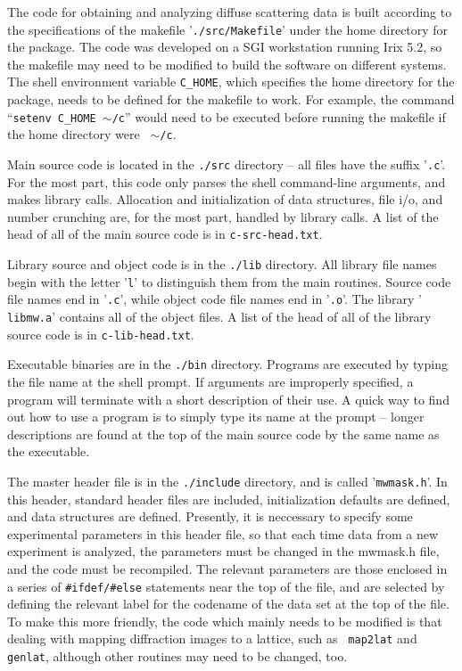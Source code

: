 
The code for obtaining and analyzing diffuse scattering data is built
according to the specifications of the makefile '{\tt ./src/Makefile}'
under the home directory for the package.  The code was developed on a
SGI workstation running Irix 5.2, so the makefile may need to be
modified to build the software on different systems.  The shell
environment variable {\tt C\_HOME}, which specifies the home directory
for the package, needs to be defined for the makefile to work.  For
example, the command ``{\tt setenv C\_HOME $\sim$/c}'' would need to be
executed before 
running the makefile if the home directory were {\tt
$\sim$/c}.

Main source code is located in the {\tt ./src} directory -- all files have
the suffix '{\tt .c}'.  For the most part, this code only parses the shell
command-line arguments, and makes library calls.  Allocation and
initialization of data structures, file i/o, and number crunching are,
for the most part,  handled by library calls.  A list of the head of
all of the main source code is in {\tt c-src-head.txt}.

Library source and object code is in the {\tt ./lib} directory.  All
library file names begin with the letter '{\tt l}' to distinguish them
from the main routines.  Source code file names end in '{\tt .c}',
while object code file names end in '{\tt .o}'.  The library '{\tt
libmw.a}' contains all of the object files.  A list of the head of all
of the library source code is in {\tt c-lib-head.txt}.

Executable binaries are in the {\tt ./bin} directory.  Programs are executed
by typing the file name at the shell prompt.  If arguments are
improperly specified, a program will terminate with a short
description of their use.  A quick way to find out how to use a
program is to simply type its name at the prompt -- longer
descriptions are found at the top of the main source code by the
same name as the executable.

The master header file is in the {\tt ./include} directory, and is
called '{\tt mwmask.h}'.  In this header, standard header files are
included, initialization defaults are defined, and data structures are
defined.  Presently, it is neccessary to specify some experimental
parameters in this header file, so that each time data from a new
experiment is analyzed, the parameters must be changed in the mwmask.h
file, and the code must be recompiled.  The relevant parameters are
those enclosed in a series of {\tt \#ifdef/\#else} statements near the
top of the file, and are selected by defining the relevant label for
the codename of the data set at the top of the file.  To make this
more friendly, the code which mainly needs to be modified is that
dealing with mapping diffraction images to a lattice, such as {\tt
map2lat} and {\tt genlat}, although other routines may need to be
changed, too.

